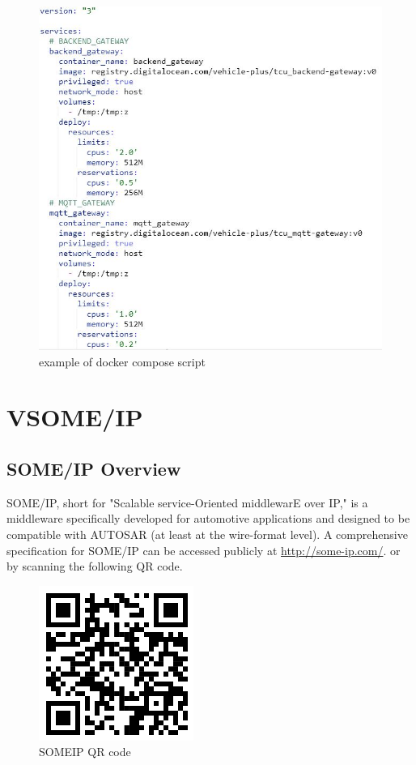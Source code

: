 \documentclass[
12pt,
oneside, 
onehalfspacing, 
nolistspacing, 
parskip, 
chapterinoneline, 
]{AASTCOMPUTER}
\begin{document}
\clearpage

\begin{figure}[h]
\centering
\includegraphics[scale=0.6]{Figures/docker_compose_script.JPG}
\caption[docker compose script]{example of docker compose script}
\label{fig:docker_compose_script}
\end{figure}

\section{VSOME/IP}
\subsection{SOME/IP Overview}
SOME/IP, short for "Scalable service-Oriented middlewarE over IP," is a middleware specifically developed for automotive applications and designed to be compatible with AUTOSAR (at least at the wire-format level). A comprehensive specification for SOME/IP can be accessed publicly at 
\url{http://some-ip.com/}. or by scanning the following QR code.

\begin{figure}[!ht]
\centering
\includegraphics[scale=1]{Figures/SOMEIP_doc.png}
\caption[SOMEIP QR code]{SOMEIP QR code}
\label{fig:SOME/IP On-wire format}
\end{figure}
\end{document}
